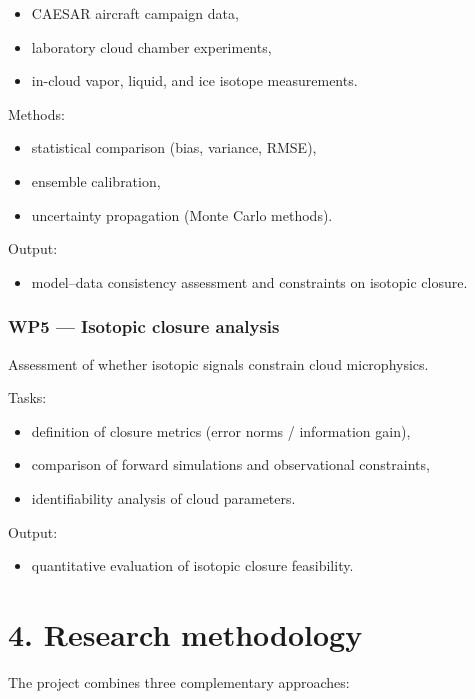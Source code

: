 \documentclass[11pt,a4paper]{article}
\begin{document}
\begin{itemize}
\item CAESAR aircraft campaign data,


\item laboratory cloud chamber experiments,


\item in-cloud vapor, liquid, and ice isotope measurements.


\end{itemize}
Methods:

\begin{itemize}
\item statistical comparison (bias, variance, RMSE),


\item ensemble calibration,


\item uncertainty propagation (Monte Carlo methods).


\end{itemize}
Output:

\begin{itemize}
\item model–data consistency assessment and constraints on isotopic closure.


\end{itemize}
\subsubsection*{WP5 — Isotopic closure analysis}
Assessment of whether isotopic signals constrain cloud microphysics.

Tasks:

\begin{itemize}
\item definition of closure metrics (error norms / information gain),


\item comparison of forward simulations and observational constraints,


\item identifiability analysis of cloud parameters.


\end{itemize}
Output:

\begin{itemize}
\item quantitative evaluation of isotopic closure feasibility.


\end{itemize}
\section*{4. Research methodology}
The project combines three complementary approaches:
\end{document}
